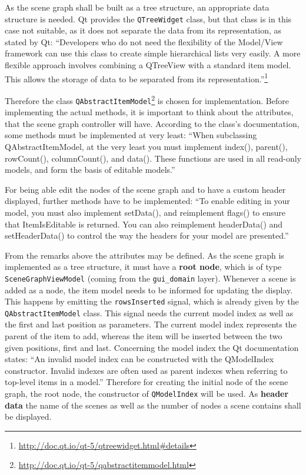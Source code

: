 \documentclass[10pt, openright, notitlepage]{scrreprt}
\begin{document}
As the scene graph shall be built as a tree structure, an appropriate data
structure is needed. Qt provides the \texttt{QTreeWidget} class, but that
class is in this case not suitable, as it does not separate the data from its
representation, as stated by Qt: ``Developers who do not need the flexibility of
the Model/View framework can use this class to create simple hierarchical lists
very easily. A more flexible approach involves combining a QTreeView with a
standard item model. This allows the storage of data to be separated from its
representation.''\footnote{\url{http://doc.qt.io/qt-5/qtreewidget.html\#details}}

Therefore the class
\texttt{QAbstractItemModel}\footnote{\url{http://doc.qt.io/qt-5/qabstractitemmodel.html}}
is chosen for implementation. Before implementing the actual methods, it is
important to think about the attributes, that the scene graph controller will
have. According to the class's documentation, some methods must be implemented
at very least: ``When subclassing QAbstractItemModel, at the very least you must
implement index(), parent(), rowCount(), columnCount(), and data(). These
functions are used in all read-only models, and form the basis of editable
models.''

For being able edit the nodes of the scene graph and to have a custom header
displayed, further methods have to be implemented: ``To enable editing in your
model, you must also implement setData(), and reimplement flags() to ensure that
ItemIsEditable is returned. You can also reimplement headerData() and
setHeaderData() to control the way the headers for your model are presented.''

From the remarks above the attributes may be defined. As the scene graph is
implemented as a tree structure, it must have a \textbf{root node}, which is of type
\texttt{SceneGraphViewModel} (coming from the \texttt{gui\_domain} layer).
Whenever a scene is added as a node, the item model needs to be informed for
updating the display. This happens by emitting the \texttt{rowsInserted}
signal, which is already given by the \texttt{QAbstractItemModel} class. This
signal needs the current model index as well as the first and last position as
parameters. The current model index represents the parent of the item to add,
whereas the item will be inserted between the two given positions, first and
last. Concerning the model index the Qt documentation states: ``An invalid model
index can be constructed with the QModelIndex constructor. Invalid indexes are
often used as parent indexes when referring to top-level items in a model.''
Therefore for creating the initial node of the scene graph, the root node, the
constructor of \texttt{QModelIndex} will be used.
As \textbf{header data} the name of the scenes as well as the number of nodes a scene
contains shall be displayed.
\end{document}
